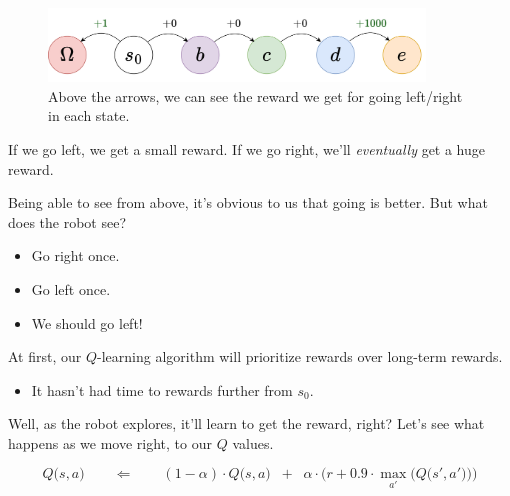         \begin{figure}[H]
            \centering
            \includegraphics[width=100mm,scale=0.5]{images/rl_images/hallway.png}
            \caption*{Above the arrows, we can see the reward we get for going left/right in each state.}
        \end{figure}
        
        If we go left, we get a small reward. If we go right, we'll \textit{eventually} get a huge reward.

        Being able to see from above, it's obvious to us that going  is better. But what does the robot see?

        \begin{itemize}
            \item Go right once. 
            \item Go left once. 
            \item We should go left!\\
        \end{itemize}

        \begin{concept}
            At first, our $Q$-learning algorithm will prioritize  rewards over long-term rewards.

            \begin{itemize}
                \item It hasn't had time to  rewards further from $s_0$.
            \end{itemize}
        \end{concept}

        Well, as the robot explores, it'll learn to get the reward, right? Let's see what happens as we move right, to our $Q$ values.

        \begin{equation}
            Q\big(s,a \big) 
            \qquad\Longleftarrow\qquad
                (1-\alpha) \cdot Q\big(s,a \big)
                \;\;+\;\;
            \alpha \cdot 
            \Big( r
                +
                0.9 \cdot
                \max_{a'} 
                    \big( Q\big(s',a' \big) \big) 
            \Big)
        \end{equation}


